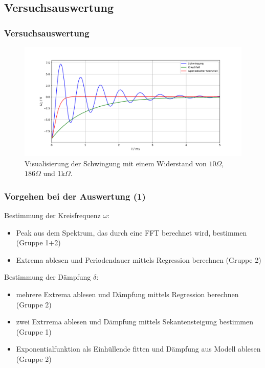 \documentclass{beamer}
\begin{document}
\subsection{Versuchsauswertung}

\begin{frame}
\frametitle{Versuchsauswertung}
\begin{figure}
\includegraphics[width=.9\linewidth]{abbildungen/rohdaten.pdf}
\caption{Visualisierung der Schwingung mit einem Widerstand von $10\Omega$, $186\Omega$ und 1k$\Omega$.}
\end{figure}
\end{frame}


\begin{frame}
\frametitle{Vorgehen bei der Auswertung (1)}
Bestimmung der Kreisfrequenz $\omega$:
\begin{itemize}
\item Peak aus dem Spektrum, das durch eine FFT berechnet wird, bestimmen (Gruppe 1+2)
\item Extrema ablesen und Periodendauer mittels Regression berechnen (Gruppe 2)
\end{itemize}

Bestimmung der Dämpfung $\delta$:
\begin{itemize}
\item mehrere Extrema ablesen und Dämpfung mittels Regression berechnen (Gruppe 2)
\item zwei Extrrema ablesen und Dämpfung mittels Sekantensteigung bestimmen (Gruppe 1)
\item Exponentialfunktion als Einhüllende fitten und Dämpfung aus Modell ablesen (Gruppe 2)
\end{itemize}
\end{frame}
\end{document}
